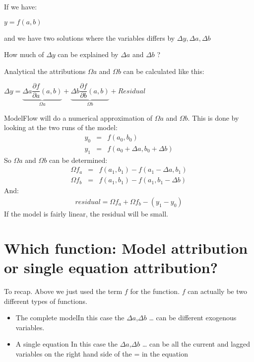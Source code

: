 \documentclass[letterpaper,10pt,english]{jupyterBook}
\begin{document}
\sphinxAtStartPar
If we have:

\sphinxAtStartPar
\(y = f(a,b)\)

\sphinxAtStartPar
and we have two solutions where the variables differs by \(\Delta y, \Delta a, \Delta b\)

\sphinxAtStartPar
How much of \(\Delta y\) can be explained by \(\Delta a\) and \(\Delta b\) ?

\sphinxAtStartPar
Analytical the attributions \(\Omega a\) and \(\Omega b\) can  be calculated like this:

\sphinxAtStartPar
\(\Delta y = \underbrace{\Delta a \dfrac{\partial {f}}{\partial{a}}(a,b)}_{\Omega a} + 
\underbrace{\Delta b \dfrac{\partial {f}}{\partial{b}}(a,b)}_{\Omega b}+Residual\)

\sphinxAtStartPar
ModelFlow will do a numerical approximation of \(\Omega a\) and \(\Omega b\). This is done by looking at the two runs of the model:
\label{equation:content/howto/attribution/Attribution background:e2cd6733-cc2d-42b5-8074-e007c8f56b88}\begin{eqnarray}  
y_0&=&f(a_{0},b_{0}) \\
y_1&=&f(a_0+\Delta a,b_{0}+ \Delta b)
\end{eqnarray}
\sphinxAtStartPar
So \(\Omega a\) and \(\Omega b\) can be determined:
\label{equation:content/howto/attribution/Attribution background:2bf407b4-1f77-45fd-b1db-60c18b739e0a}\begin{eqnarray}  
\Omega f_a&=&f(a_1,b_1 )-f(a_1-\Delta a,b_1) \\
\Omega f_b&=&f(a_1,b_1 )-f(a_1,b_1-\Delta  b)
\end{eqnarray}
\sphinxAtStartPar
And:
\label{equation:content/howto/attribution/Attribution background:3a5117f2-5b80-41e2-88d2-22467244cbbb}\begin{eqnarray}
residual = \Omega f_a + \Omega f_b -(y_1 - y_0) 
\end{eqnarray}
\sphinxAtStartPar
If the model is fairly linear, the residual will be small.


\section{Which function: Model attribution or  single equation attribution?}
\label{\detokenize{content/howto/attribution/Attribution background:which-function-model-attribution-or-single-equation-attribution}}
\sphinxAtStartPar
To recap. Above we just used the term \(f\) for the function. \(f\) can actually be two different types of functions.
\begin{itemize}
\item {} 
\sphinxAtStartPar
The complete modelIn this case the \(\Delta a\),\(\Delta b\) … can be different exogenous variables.

\item {} 
\sphinxAtStartPar
A single equation In this case the \(\Delta a\),\(\Delta b\) … can be all the current and lagged variables on the right hand side of the = in the equation

\end{itemize}
\end{document}
